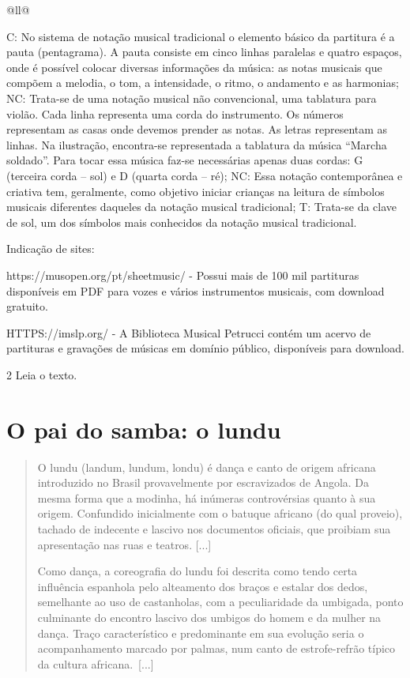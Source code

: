 \begin{itemize}
\begin{itemize}
\begin{escolha}[]{@{}ll@{}}
{C: No sistema de notação musical tradicional o elemento básico da
partitura é a pauta (pentagrama). A pauta consiste em cinco linhas
paralelas e quatro espaços, onde é possível colocar diversas informações
da música: as notas musicais que compõem a melodia, o tom, a
intensidade, o ritmo, o andamento e as harmonias;
NC: Trata-se de uma notação musical não convencional, uma tablatura para
violão. Cada linha representa uma corda do instrumento. Os números
representam as casas onde devemos prender as notas. As letras
representam as linhas. Na ilustração, encontra-se representada a
tablatura da música ``Marcha soldado''. Para tocar essa música faz-se
necessárias apenas duas cordas: G (terceira corda -- sol) e D (quarta
corda -- ré);
NC: Essa notação contemporânea e criativa tem, geralmente, como objetivo
iniciar crianças na leitura de símbolos musicais diferentes daqueles da
notação musical tradicional;
T: Trata-se da clave de sol, um dos símbolos mais conhecidos da notação
musical tradicional.

Indicação de sites:

https://musopen.org/pt/sheetmusic/ - Possui mais de 100 mil
partituras disponíveis em PDF para vozes e vários instrumentos musicais,
com download gratuito.

HTTPS://imslp.org/ - A Biblioteca Musical
Petrucci contém um acervo de partituras e gravações de músicas em
domínio público, disponíveis para download.}

\num{2} Leia o texto.

\section{O pai do samba: o lundu}

\begin{quote}
O lundu (landum, lundum, londu) é dança e canto de origem africana
introduzido no Brasil provavelmente por escravizados de Angola. Da mesma
forma que a modinha, há inúmeras controvérsias quanto à sua origem.
Confundido inicialmente com o batuque africano (do qual proveio),
tachado de indecente e lascivo nos documentos oficiais, que proibiam sua
apresentação nas ruas e teatros. {[}...{]}

Como dança, a coreografia do lundu foi descrita como tendo certa
influência espanhola pelo alteamento dos braços e estalar dos dedos,
semelhante ao uso de castanholas, com a peculiaridade da umbigada, ponto
culminante do encontro lascivo dos umbigos do homem e da mulher na
dança. Traço característico e predominante em sua evolução seria o
acompanhamento marcado por palmas, num canto de estrofe-refrão típico da
cultura africana.~{[}...{]}


\end{quote}
\end{escolha}
\end{itemize}
\end{itemize}
